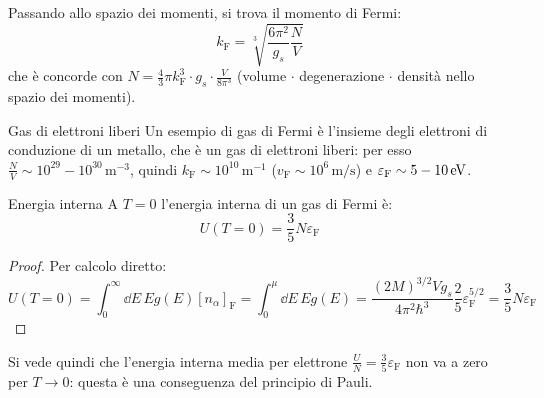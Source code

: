 Passando allo spazio dei momenti, si trova il momento di Fermi:
\begin{equation}
	k_\text{F} = \sqrt[3]{\frac{6\pi^2}{g_s} \frac{N}{V}}
\end{equation}
che è concorde con $ N = \frac{4}{3} \pi k_\text{F}^3 \cdot g_s \cdot \frac{V}{8\pi^3} $ (volume $ \cdot $ degenerazione $ \cdot $ densità nello spazio dei momenti).

\begin{example}{Gas di elettroni liberi}{}
	Un esempio di gas di Fermi è l'insieme degli elettroni di conduzione di un metallo, che è un gas di elettroni liberi: per esso $ \frac{N}{V} \sim 10^{29}-10^{30} \,\text{m}^{-3} $, quindi $ k_\text{F} \sim 10^{10} \,\text{m}^{-1} $ ($ v_\text{F} \sim 10^6 \,\text{m}/\text{s} $) e $ \varepsilon_\text{F} \sim 5-10 \,\mathrm{eV} $.
\end{example}

\begin{proposition}{Energia interna}{}
	A $ T = 0 $ l'energia interna di un gas di Fermi è:
	\begin{equation}
		U(T = 0) = \frac{3}{5} N \varepsilon_\text{F}
	\end{equation}

	\tcblower

	\begin{proof}
		Per calcolo diretto:
		\begin{equation*}
			U(T = 0) = \int_0^\infty \dd E\, E g(E) [n_\alpha]_\text{F} = \int_0^\mu \dd E\, E g(E) = \frac{(2M)^{3/2} V g_s}{4\pi^2 \hbar^3} \frac{2}{5} \varepsilon_\text{F}^{5/2} = \frac{3}{5} N \varepsilon_\text{F}
		\end{equation*}
	\end{proof}
\end{proposition}

Si vede quindi che l'energia interna media per elettrone $ \frac{U}{N} = \frac{3}{5} \varepsilon_\text{F} $ non va a zero per $ T \rightarrow 0 $: questa è una conseguenza del principio di Pauli.

